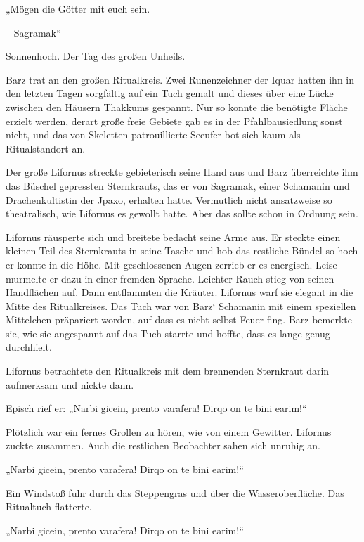„Mögen die Götter mit euch sein.

– Sagramak“\bigskip







Sonnenhoch. Der Tag des großen Unheils.\bigskip



Barz trat an den großen Ritualkreis. Zwei Runenzeichner der Iquar hatten ihn in den letzten Tagen sorgfältig auf ein Tuch gemalt und dieses über eine Lücke zwischen den Häusern Thakkums gespannt. Nur so konnte die benötigte Fläche erzielt werden, derart große freie Gebiete gab es in der Pfahlbausiedlung sonst nicht, und das von Skeletten patrouillierte Seeufer bot sich kaum als Ritualstandort an.

Der große Lifornus streckte gebieterisch seine Hand aus und Barz überreichte ihm das Büschel gepressten Sternkrauts, das er von Sagramak, einer Schamanin und Drachenkultistin der Jpaxo, erhalten hatte. Vermutlich nicht ansatzweise so theatralisch, wie Lifornus es gewollt hatte. Aber das sollte schon in Ordnung sein.

Lifornus räusperte sich und breitete bedacht seine Arme aus. Er steckte einen kleinen Teil des Sternkrauts in seine Tasche und hob das restliche Bündel so hoch er konnte in die Höhe. Mit geschlossenen Augen zerrieb er es energisch. Leise murmelte er dazu in einer fremden Sprache. Leichter Rauch stieg von seinen Handflächen auf. Dann entflammten die Kräuter. Lifornus warf sie elegant in die Mitte des Ritualkreises. Das Tuch war von Barz‘ Schamanin mit einem speziellen Mittelchen präpariert worden, auf dass es nicht selbst Feuer fing. Barz bemerkte sie, wie sie angespannt auf das Tuch starrte und hoffte, dass es lange genug durchhielt.

Lifornus betrachtete den Ritualkreis mit dem brennenden Sternkraut darin aufmerksam und nickte dann.

Episch rief er: „Narbi gicein, prento varafera! Dirqo on te bini earim!“

Plötzlich war ein fernes Grollen zu hören, wie von einem Gewitter. Lifornus zuckte zusammen. Auch die restlichen Beobachter sahen sich unruhig an.

„Narbi gicein, prento varafera! Dirqo on te bini earim!“

Ein Windstoß fuhr durch das Steppengras und über die Wasseroberfläche. Das Ritualtuch flatterte.

„Narbi gicein, prento varafera! Dirqo on te bini earim!“

